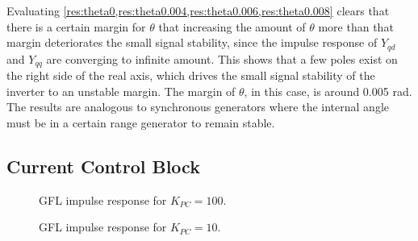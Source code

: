 Evaluating \cref{res:theta0,res:theta0.004,res:theta0.006,res:theta0.008} clears that there is a certain margin for $\theta$ that  increasing the amount of $\theta$ more than that margin deteriorates the small signal stability, since the impulse response of $Y_{qd}$ and $Y_{qq}$ are converging to infinite amount. This shows that a few poles exist on the right side of the real axis, which drives the small signal stability of the inverter to an unstable margin. The margin of $\theta$, in this case, is around 0.005 rad. The results are analogous to synchronous generators where the internal angle must be in a certain range generator to remain stable.

\subsection{Current Control Block}

\begin{figure}[ht]
\begin{center}
    \centering
   \nonindent
	\caption[GFL impulse response for $K_{PC}=100$]{GFL impulse response for $K_{PC}=100$.}
	\label{res:Kpc(100)}
	\end{center}
\end{figure}

\begin{figure}[ht]
\begin{center}
    \centering
   \nonindent
	\caption[GFL impulse response for $K_{PC}=10$]{GFL impulse response for $K_{PC}=10$.}
	\label{res:Kpc(10)}
	\end{center}
\end{figure}


